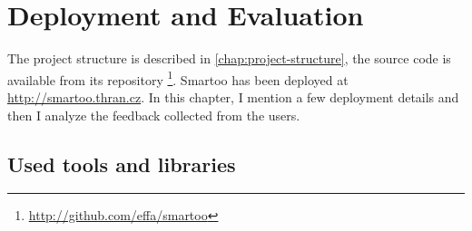 \documentclass[12pt, twoside]{fithesis2}
\renewcommand{\_}{\leavevmode \kern0.07em\vbox{\hrule width0.4em}}
\begin{document}
\chapter{Deployment and Evaluation}
\label{chap:evaluation}

The project structure is described in \autoref{chap:project-structure},
the source code is available from its repository%
\footnote{\url{http://github.com/effa/smartoo}}.
Smartoo has been deployed at \url{http://smartoo.thran.cz}.
In this chapter, I mention a few deployment details
and then I analyze the feedback collected from the users.

\section{Used tools and libraries}
\label{sec:tools}
\end{document}
